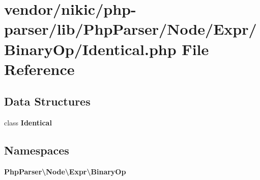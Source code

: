 \section{vendor/nikic/php-\/parser/lib/\+Php\+Parser/\+Node/\+Expr/\+Binary\+Op/\+Identical.php File Reference}
\label{_identical_8php}
\subsection*{Data Structures}
\begin{DoxyCompactItemize}
\item 
class {\bf Identical}
\end{DoxyCompactItemize}
\subsection*{Namespaces}
\begin{DoxyCompactItemize}
\item 
 {\bf Php\+Parser\textbackslash{}\+Node\textbackslash{}\+Expr\textbackslash{}\+Binary\+Op}
\end{DoxyCompactItemize}
